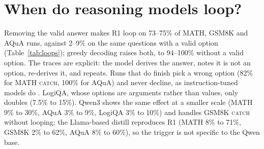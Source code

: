 \documentclass[11pt]{article}
\newcommand{\think}{\texttt{</think>}}
\begin{document}
\section{When do reasoning models loop?}
\label{sec:when}

\begin{table}[t]
\centering
\small
\setlength{\tabcolsep}{3.5pt}
\caption{Loop rate (\%): the run never emits \think{} within 12k tokens. Sampled ($T{=}0.6$) rates are
means over 4 seeds (Llama: 2). Top: the same questions with and without a valid option; bottom: natural
benchmarks.}
\label{tab:loops}
\end{table}

Removing the valid answer makes R1 loop on 73--75\% of MATH, GSM8K and AQuA runs, against 2--9\% on
the same questions with a valid option (Table~\ref{tab:loops}); greedy decoding raises both, to
94--100\% without a valid option. The traces are explicit: the model derives the answer, notes it is
not an option, re-derives it, and repeats. Runs that do finish pick a wrong option (82\% for MATH
\textsc{catch}, 100\% for AQuA) and never decline, as instruction-tuned models do
\citep{goral2025wait}. LogiQA, whose options are arguments rather than values, only doubles (7.5\% to
15\%). Qwen3 shows the same effect at a smaller scale (MATH 9\% to 30\%, AQuA 3\% to 9\%, LogiQA 3\% to
10\%) and handles GSM8K \textsc{catch} without looping; the Llama-based distill reproduces R1 (MATH 8\% to
71\%, GSM8K 2\% to 62\%, AQuA 8\% to 60\%), so the trigger is not specific to the Qwen base.
\end{document}
